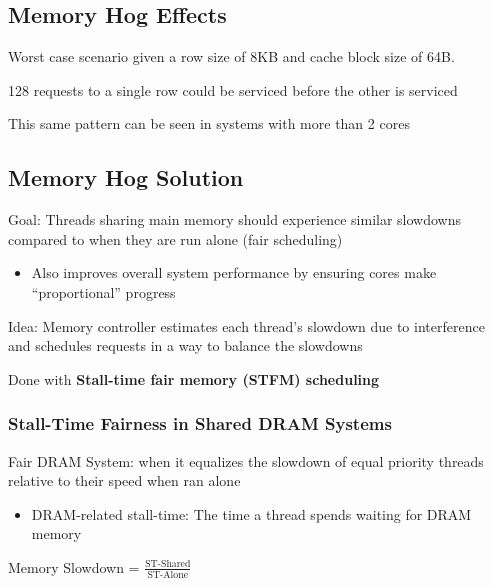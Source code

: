 \documentclass[]{article}
\providecommand{\tightlist}{%
  \setlength{\itemsep}{0pt}\setlength{\parskip}{0pt}}
\begin{document}
\hypertarget{memory-hog-effects}{%
\subsection{Memory Hog Effects}\label{memory-hog-effects}}

Worst case scenario given a row size of 8KB and cache block size of 64B.

128 requests to a single row could be serviced before the other is
serviced

This same pattern can be seen in systems with more than 2 cores

\hypertarget{memory-hog-solution}{%
\subsection{Memory Hog Solution}\label{memory-hog-solution}}

Goal: Threads sharing main memory should experience similar slowdowns
compared to when they are run alone (fair scheduling)

\begin{itemize}
\tightlist
\item
  Also improves overall system performance by ensuring cores make
  ``proportional'' progress
\end{itemize}

Idea: Memory controller estimates each thread's slowdown due to
interference and schedules requests in a way to balance the slowdowns

Done with \textbf{Stall-time fair memory (STFM) scheduling}

\hypertarget{stall-time-fairness-in-shared-dram-systems}{%
\subsubsection{Stall-Time Fairness in Shared DRAM
Systems}\label{stall-time-fairness-in-shared-dram-systems}}

Fair DRAM System: when it equalizes the slowdown of equal priority
threads relative to their speed when ran alone

\begin{itemize}
\tightlist
\item
  DRAM-related stall-time: The time a thread spends waiting for DRAM
  memory
\end{itemize}

Memory Slowdown =
\(\displaystyle\frac{\text{ST-Shared}}{\text{ST-Alone}}\)
\end{document}
